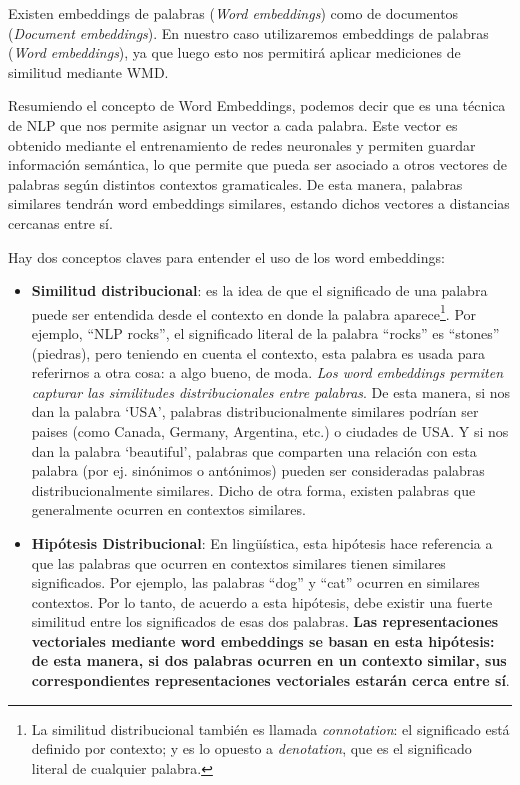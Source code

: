\documentclass[12pt,a4paper]{article}
\begin{document}
\begin{sloppypar}
Existen embeddings de palabras (\textit{Word embeddings}) como de documentos (\textit{Document embeddings})\cite{NLP_10}. En nuestro caso utilizaremos embeddings de palabras (\textit{Word embeddings}), ya que luego esto nos permitirá aplicar mediciones de similitud mediante WMD. 

Resumiendo el concepto de Word Embeddings, podemos decir que es una técnica de NLP que nos permite asignar un vector a cada palabra. Este vector es obtenido mediante el entrenamiento de redes neuronales y permiten guardar información semántica, lo que permite que pueda ser asociado a otros vectores de palabras según distintos contextos gramaticales. De esta manera, palabras similares tendrán word embeddings similares, estando dichos vectores a distancias cercanas entre sí.

Hay dos conceptos claves para entender el uso de los word embeddings:
\begin{itemize}
\item \textbf{Similitud distribucional}\cite{NLP_26}: es la idea de que el significado de una palabra puede ser entendida desde el contexto en donde la palabra aparece\footnote{La similitud distribucional también es llamada \textit{connotation}: el significado está definido por contexto; y es lo opuesto a \textit{denotation}, que es el significado literal de cualquier palabra.}. Por ejemplo, “NLP rocks”, el significado literal de la palabra “rocks” es “stones” (piedras), pero teniendo en cuenta el contexto, esta palabra es usada para referirnos a otra cosa: a algo bueno, de moda.  \textit{Los word embeddings permiten capturar las similitudes distribucionales entre palabras}.  De esta manera, si nos dan la palabra ‘USA’, palabras distribucionalmente similares podrían ser paises (como Canada, Germany, Argentina, etc.) o ciudades de USA. Y si nos dan la palabra ‘beautiful’, palabras que comparten una relación con esta palabra (por ej. sinónimos o antónimos) pueden ser consideradas palabras distribucionalmente similares. Dicho de otra forma, existen palabras que generalmente ocurren en contextos similares.
\item \textbf{Hipótesis Distribucional}\cite{NLP_26}: En lingüística, esta hipótesis hace referencia a que las palabras que ocurren en contextos similares tienen similares significados. Por ejemplo, las palabras “dog” y “cat” ocurren en similares contextos. Por lo tanto, de acuerdo a esta hipótesis, debe existir una fuerte similitud entre los significados de esas dos palabras. \textbf{Las representaciones vectoriales mediante word embeddings se basan en esta hipótesis: de esta manera, si dos palabras ocurren en un contexto similar, sus correspondientes representaciones vectoriales estarán cerca entre sí}.  


\end{itemize}
\end{sloppypar}
\end{document}
